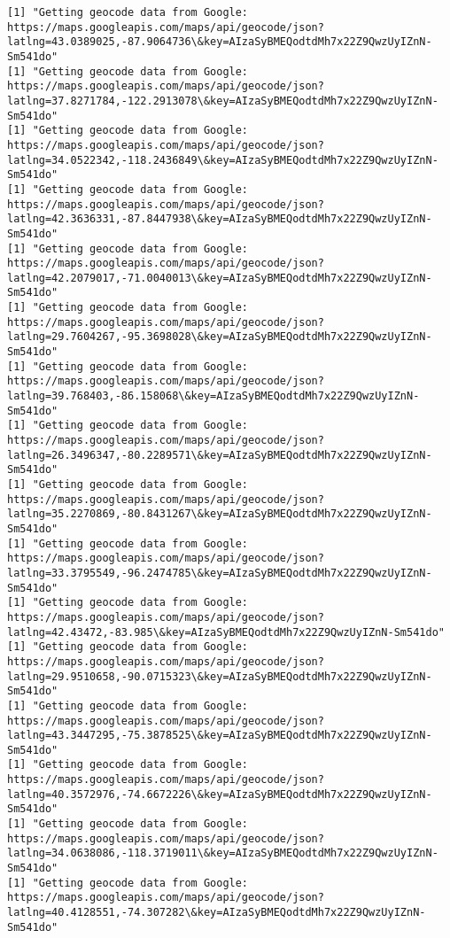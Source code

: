 \documentclass[11pt]{article}
\begin{document}
\begin{Verbatim}[commandchars=\\\{\}]
[1] "Getting geocode data from Google: https://maps.googleapis.com/maps/api/geocode/json?latlng=43.0389025,-87.9064736\&key=AIzaSyBMEQodtdMh7x22Z9QwzUyIZnN-Sm541do"
[1] "Getting geocode data from Google: https://maps.googleapis.com/maps/api/geocode/json?latlng=37.8271784,-122.2913078\&key=AIzaSyBMEQodtdMh7x22Z9QwzUyIZnN-Sm541do"
[1] "Getting geocode data from Google: https://maps.googleapis.com/maps/api/geocode/json?latlng=34.0522342,-118.2436849\&key=AIzaSyBMEQodtdMh7x22Z9QwzUyIZnN-Sm541do"
[1] "Getting geocode data from Google: https://maps.googleapis.com/maps/api/geocode/json?latlng=42.3636331,-87.8447938\&key=AIzaSyBMEQodtdMh7x22Z9QwzUyIZnN-Sm541do"
[1] "Getting geocode data from Google: https://maps.googleapis.com/maps/api/geocode/json?latlng=42.2079017,-71.0040013\&key=AIzaSyBMEQodtdMh7x22Z9QwzUyIZnN-Sm541do"
[1] "Getting geocode data from Google: https://maps.googleapis.com/maps/api/geocode/json?latlng=29.7604267,-95.3698028\&key=AIzaSyBMEQodtdMh7x22Z9QwzUyIZnN-Sm541do"
[1] "Getting geocode data from Google: https://maps.googleapis.com/maps/api/geocode/json?latlng=39.768403,-86.158068\&key=AIzaSyBMEQodtdMh7x22Z9QwzUyIZnN-Sm541do"
[1] "Getting geocode data from Google: https://maps.googleapis.com/maps/api/geocode/json?latlng=26.3496347,-80.2289571\&key=AIzaSyBMEQodtdMh7x22Z9QwzUyIZnN-Sm541do"
[1] "Getting geocode data from Google: https://maps.googleapis.com/maps/api/geocode/json?latlng=35.2270869,-80.8431267\&key=AIzaSyBMEQodtdMh7x22Z9QwzUyIZnN-Sm541do"
[1] "Getting geocode data from Google: https://maps.googleapis.com/maps/api/geocode/json?latlng=33.3795549,-96.2474785\&key=AIzaSyBMEQodtdMh7x22Z9QwzUyIZnN-Sm541do"
[1] "Getting geocode data from Google: https://maps.googleapis.com/maps/api/geocode/json?latlng=42.43472,-83.985\&key=AIzaSyBMEQodtdMh7x22Z9QwzUyIZnN-Sm541do"
[1] "Getting geocode data from Google: https://maps.googleapis.com/maps/api/geocode/json?latlng=29.9510658,-90.0715323\&key=AIzaSyBMEQodtdMh7x22Z9QwzUyIZnN-Sm541do"
[1] "Getting geocode data from Google: https://maps.googleapis.com/maps/api/geocode/json?latlng=43.3447295,-75.3878525\&key=AIzaSyBMEQodtdMh7x22Z9QwzUyIZnN-Sm541do"
[1] "Getting geocode data from Google: https://maps.googleapis.com/maps/api/geocode/json?latlng=40.3572976,-74.6672226\&key=AIzaSyBMEQodtdMh7x22Z9QwzUyIZnN-Sm541do"
[1] "Getting geocode data from Google: https://maps.googleapis.com/maps/api/geocode/json?latlng=34.0638086,-118.3719011\&key=AIzaSyBMEQodtdMh7x22Z9QwzUyIZnN-Sm541do"
[1] "Getting geocode data from Google: https://maps.googleapis.com/maps/api/geocode/json?latlng=40.4128551,-74.307282\&key=AIzaSyBMEQodtdMh7x22Z9QwzUyIZnN-Sm541do"

\end{Verbatim}
\end{document}
